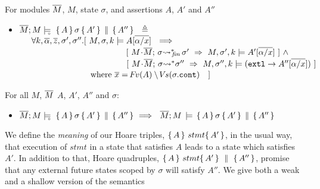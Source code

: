{\begin{definition}
\label{def:restrict}
For modules $\overline{M}$, $M$, state $\sigma$,  
and assertions $A$, $A'$ and  $A''$
\begin{itemize}
\item
$ {\overline{M};M \models\!\!\!\!_{_{\circ}}\  \, \{\, A\,\}\, \sigma\, \{\, A'\,\} \,\parallel\, \{\, A''\,\}  } \ \ \triangleq \ \ $  \\
$\strut \hspace{.5cm} \forall k,\overline{\alpha}, \overline{z}, \sigma',\sigma''.[
\    %
  \satDAssertFrom M  \sigma k   {A[\overline{\alpha/x}]} \  
  \ \Longrightarrow$\\
$\strut \hspace{4.5cm}    [ \ {\leadstoBoundedStarFin {M\madd \Mtwo}{\sigma}  {\sigma'} }\  \Rightarrow \    \satDAssertFrom M  {\sigma'} k   {A'[\overline{\alpha/x}}]\ ]  \ \wedge$\\
$\strut \hspace{4.5cm}    [ \ {\leadstoBoundedStar  {M\madd \Mtwo}{\sigma}  {\sigma''} }\  \Rightarrow\      \satDAssertFrom M  {\sigma''}  k  {(\externalexec \rightarrow A''[\overline{\alpha/x}])} \ ] $\\
$\strut \hspace{2.3cm}\ \ \  \ \ \ \mbox{where } \overline x={{{\hspace{-1pt}F\hspace{-1pt}}v(A)\setminus{\hspace{-1pt}V\hspace{-1pt}}s(\sigma.\mbox{\normalfont{\texttt{cont}}})}}\ \ \ ]$
\end{itemize}
\end{definition}
}

\begin{lemma} 
For all $M$, $\overline{M}$ $A$, $A'$, $A''$ and $\sigma$:
\begin{itemize}
\item
$ {\overline{M};M \models\!\!\!\!_{_{\circ}}\  \, \{\, A\,\}\, \sigma\, \{\, A'\,\} \,\parallel\, \{\, A''\,\}  } \ \Longrightarrow \ \
  {\overline{M}; M\, \models \, \{\, A\,\}\, \sigma \, \{\, A'\,\} \,\parallel\, \{\, A''\,\}  } $
\end{itemize}
\end{lemma}

\label{sect:HLmeans}

We  define the {\emph {meaning}} of  our Hoare triples, $ \{\, A \, \}\ stmt \{\, A' \, \}$,  in the usual way, \ie that execution of $stmt$ in a state that satisfies $A$ leads to a state which satisfies $A'$.  
In addition to that, Hoare quadruples, $ \{\, A \, \}\ stmt \{\, A' \, \} \, \,\parallel\,\, \{\, A'' \, \} $, promise that any external future states scoped by $\sigma$ will satisfy $A''$.
We give both a weak and a shallow version of the semantics


